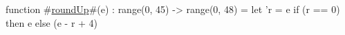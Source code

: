 function #\hyperref[zroundUp]{roundUp}#(e) : range(0, 45) -> range(0, 48) =
    let 'r = e %
    if (r == 0)
    then e
    else (e - r + 4)
